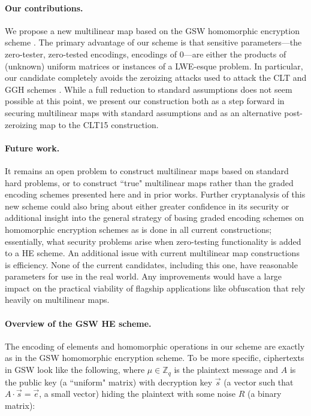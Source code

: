 \paragraph{Our contributions.}  We propose a new multilinear map based on the GSW homomorphic encryption scheme \cite{gsw}.  The primary advantage of our scheme is that sensitive parameters---the zero-tester, zero-tested encodings, encodings of $0$---are either the products of (unknown) uniform matrices or instances of a LWE-esque problem.  In particular, our candidate completely avoids the zeroizing attacks used to attack the CLT and GGH schemes \cite{chl, cgh, hj}.  While a full reduction to standard assumptions does not seem possible at this point, we present our construction both as a step forward in securing multilinear maps with standard assumptions and as an alternative post-zeroizing map to the CLT15 construction.

\paragraph{Future work.}  It remains an open problem to construct multilinear maps based on standard hard problems, or to construct ``true" multilinear maps rather than the graded encoding schemes presented here and in prior works.  Further cryptanalysis of this new scheme could also bring about either greater confidence in its security or additional insight into the general strategy of basing graded encoding schemes on homomorphic encryption schemes as is done in all current constructions; essentially, what security problems arise when zero-testing functionality is added to a HE scheme.  An additional issue with current multilinear map constructions is efficiency.  None of the current candidates, including this one, have reasonable parameters for use in the real world.  Any improvements would have a large impact on the practical viability of flagship applications like obfuscation that rely heavily on multilinear maps.

\paragraph{Overview of the GSW HE scheme.}  The encoding of elements and homomorphic operations in our scheme are exactly as in the GSW homomorphic encryption scheme.  To be more specific, ciphertexts in GSW look like the following, where $\mu \in \mathbb{Z}_q$ is the plaintext message and $A$ is the public key (a ``uniform" matrix) with decryption key $\vec{s}$ (a vector such that $A\cdot \vec{s} = \vec{e}$, a small vector) hiding the plaintext with some noise $R$ (a binary matrix):

